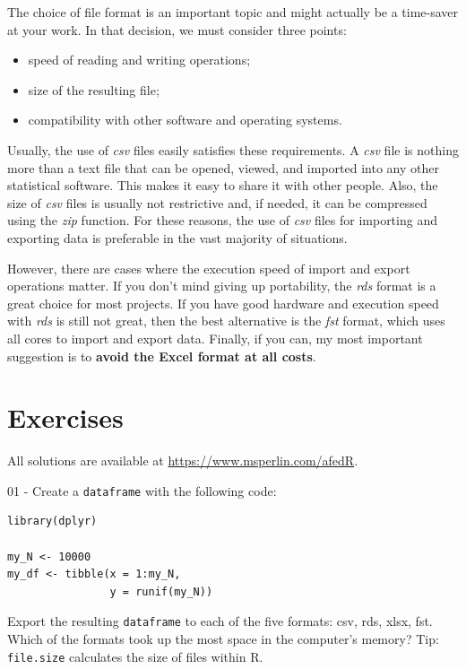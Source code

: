 \documentclass[
  12pt,
]{book}
\providecommand{\tightlist}{%
  \setlength{\itemsep}{0pt}\setlength{\parskip}{0pt}}
\begin{document}
The choice of file format is an important topic and might actually be a time-saver at your work. In that decision, we must consider three points:

\begin{itemize}
\tightlist
\item
  speed of reading and writing operations;
\item
  size of the resulting file;
\item
  compatibility with other software and operating systems.
\end{itemize}

Usually, the use of \emph{csv} files easily satisfies these requirements. A \emph{csv} file is nothing more than a text file that can be opened, viewed, and imported into any other statistical software. This makes it easy to share it with other people. Also, the size of \emph{csv} files is usually not restrictive and, if needed, it can be compressed using the \emph{zip} function. For these reasons, the use of \emph{csv} files for importing and exporting data is preferable in the vast majority of situations. 

However, there are cases where the execution speed of import and export operations matter. If you don't mind giving up portability, the \emph{rds} format is a great choice for most projects. If you have good hardware and execution speed with \emph{rds} is still not great, then the best alternative is the \emph{fst} format, which uses all cores to import and export data. Finally, if you can, my most important suggestion is to \textbf{avoid the Excel format at all costs}.

\hypertarget{exerc-importacao-exportacao}{%
\section{Exercises}\label{exerc-importacao-exportacao}}

All solutions are available at \url{https://www.msperlin.com/afedR}.

01 -
Create a \texttt{dataframe} with the following code:

\begin{verbatim}
library(dplyr)

my_N <- 10000
my_df <- tibble(x = 1:my_N,
                y = runif(my_N))
\end{verbatim}

Export the resulting \texttt{dataframe} to each of the five formats: csv, rds, xlsx, fst. Which of the formats took up the most space in the computer's memory? Tip: \texttt{file.size} calculates the size of files within R.
\end{document}
